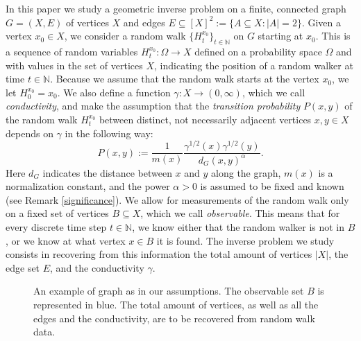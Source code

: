 \documentclass[a4paper,11pt,oneside]{amsart}
\newcommand{\N}{{\mathbb N}}
\begin{document}
In this paper we study a geometric inverse problem on a finite, connected graph $G=(X,E)$ of vertices $X$ and edges $E\subseteq [X]^2:= \{A\subseteq X : |A|=2\}$. Given a vertex $x_0\in X$, we consider a random walk $\{H^{x_0}_t\}_{t\in\N}$ on $G$ starting at $x_0$. This is a sequence of random variables $H^{x_0}_t:\Omega\rightarrow X$ defined on a probability space $\Omega$ and with values in the set of vertices $X$, indicating the position of a random walker at time $t\in\N$. Because we assume that the random walk starts at the vertex $x_0$, we let $H^{x_0}_0=x_0$. We also define a function $\gamma: X\rightarrow (0,\infty)$, which we call \emph{conductivity}, and make the assumption that the \emph{transition probability} $P(x,y)$ of the random walk $H^{x_0}_t$ between distinct, not necessarily adjacent vertices $x,y\in X$ depends on $\gamma$ in the following way:
$$ P(x,y):= \frac{1}{m(x)} \frac{\gamma^{1/2}(x)\gamma^{1/2}(y)}{d_G(x,y)^{\alpha}}. $$
Here $d_G$ indicates the distance between $x$ and $y$ along the graph, $m(x)$ is a normalization constant, and the power $\alpha>0$ is assumed to be fixed and known (see Remark \ref{significance}). We allow for measurements of the random walk only on a fixed set of vertices $B\subseteq X$, which we call \emph{observable}. This means that for every discrete time step $t\in\N$, we know either that the random walker is not in $B$, or we know at what vertex $x\in B$ it is found. The inverse problem we study consists in recovering from this information the total amount of vertices $|X|$, the edge set $E$, and the conductivity $\gamma$. \\

\begin{figure}[!h] \label{figure-intro}
\centering
{}
\caption{An example of graph as in our assumptions. The observable set $B$ is represented in blue. The total amount of vertices, as well as all the edges and the conductivity, are to be recovered from random walk data.}
\end{figure}
\end{document}
